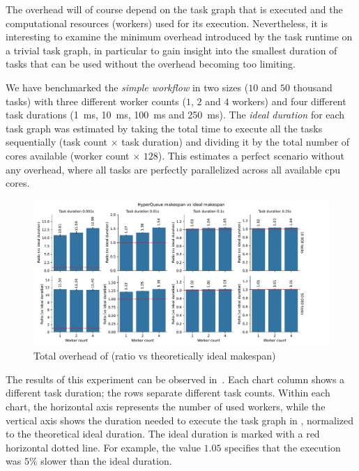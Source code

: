 The overhead will of course depend on the task graph that is executed and the computational
resources (workers) used for its execution. Nevertheless, it is interesting to examine the minimum
overhead introduced by the task runtime on a trivial task graph, in particular to gain insight into
the smallest duration of tasks that can be used without the overhead becoming too limiting.

We have benchmarked the \emph{simple workflow} in two sizes ($10$ and
$50$ thousand tasks) with three different worker counts ($1$,
$2$ and $4$ workers) and four different task durations
(\SI{1}{\milli\second}, \SI{10}{\milli\second}, \SI{100}{\milli\second} and
\SI{250}{\milli\second}). The \emph{ideal duration} for each task graph was estimated by taking
the total time to execute all the tasks sequentially (task count $\times$ task duration) and
dividing it by the total number of cores available (worker count $\times$ $128$). This estimates a
perfect scenario without any overhead, where all tasks are perfectly parallelized across all
available \gls{cpu} cores.

\begin{figure}[h]
	\centering
	\includegraphics[width=\textwidth]{imgs/hq/charts/total-overhead-vs-ideal}
	\caption{Total overhead of \hyperqueue{} (ratio vs theoretically ideal makespan)}
	\label{fig:hq-overhead-vs-ideal}
\end{figure}

The results of this experiment can be observed in~. Each chart column shows
a different task duration; the rows separate different task counts. Within each chart, the
horizontal axis represents the number of used workers, while the vertical axis shows the duration
needed to execute the task graph in \hyperqueue{}, normalized to the theoretical ideal
duration. The ideal duration is marked with a red horizontal dotted line. For example, the value
$1.05$ specifies that the \hyperqueue{} execution was
$5\%$ slower than the ideal duration.

